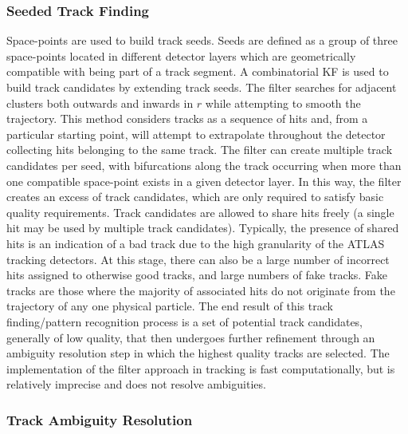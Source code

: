\subsubsection{Seeded Track Finding}
Space-points are used to build track seeds. Seeds are defined as a group of three space-points located in different detector layers which are geometrically compatible with being part of a track segment. A combinatorial KF is used to build track candidates by extending track seeds. The filter searches for adjacent clusters both outwards and inwards in $r$ while attempting to smooth the trajectory. This method considers tracks as a sequence of hits and, from a particular starting point, will attempt to extrapolate throughout the detector collecting hits belonging to the same track. The filter can create multiple track candidates per seed, with bifurcations along the track occurring when more than one compatible space-point exists in a given detector layer. In this way, the filter creates an excess of track candidates, which are only required to satisfy basic quality requirements. Track candidates are allowed to share hits freely (a single hit may be used by multiple track candidates). Typically, the presence of shared hits is an indication of a bad track due to the high granularity of the ATLAS tracking detectors. At this stage, there can also be a large number of incorrect hits assigned to otherwise good tracks, and large numbers of fake tracks. Fake tracks are those where the majority of associated hits do not originate from the trajectory of any one physical particle. The end result of this track finding/pattern recognition process is a set of potential track candidates, generally of low quality, that then undergoes further refinement through an ambiguity resolution step in which the highest quality tracks are selected. The implementation of the filter approach in tracking is fast computationally, but is relatively imprecise and does not resolve ambiguities.

\subsubsection{Track Ambiguity Resolution}
\label{chapter-3-ambiguity-resolution}

